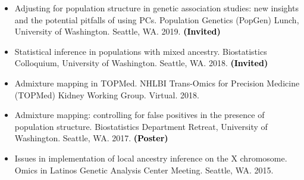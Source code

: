 \documentclass[margin]{res}
\newcommand{\annotate}[1]{\textcolor{black}{\textbf{(#1)}}}
\begin{document}
\begin{resume}
\begin{itemize}
\item[14.] Adjusting for population structure in genetic association studies: new insights and the potential pitfalls of using PCs. 
Population Genetics (PopGen) Lunch, University of Washington. Seattle, WA. 2019.  
\annotate{Invited}




\item[13.] %
Statistical inference in populations with mixed ancestry. 
Biostatistics Colloquium, University of Washington. Seattle, WA. 2018.  
\annotate{Invited}

\item[12.] Admixture mapping in TOPMed. 
NHLBI Trans-Omics for Precision Medicine (TOPMed) Kidney Working Group. Virtual. 2018.  


\item[11.] %
Admixture mapping: controlling for false positives in the presence of population structure. 
Biostatistics Department Retreat, University of Washington. Seattle, WA. 2017. 
\annotate{Poster}



\item[10.] %
Issues in implementation of local ancestry inference on the X chromosome. 
Omics in Latinos Genetic Analysis Center Meeting. Seattle, WA. 2015.


\end{itemize}
\end{resume}
\end{document}
